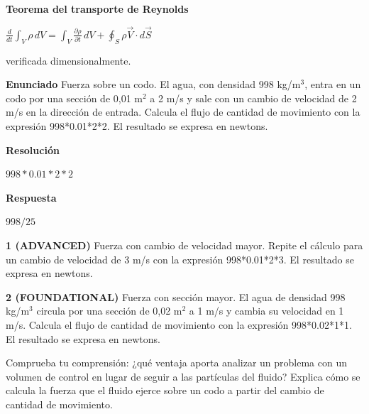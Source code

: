 \documentclass{book}
\begin{document}
\begin{tcolorbox}[title={Derivaciones}, studiumdef, breakable]

\noindent\textbf{Teorema del transporte de Reynolds}

\(\frac{d}{dt}\int_{V} \rho\,dV = \int_{V} \frac{\partial \rho}{\partial t}\,dV + \oint_{S} \rho \vec{V}\cdot d\vec{S}\)

\noindent\footnotesize verificada dimensionalmente.
\end{tcolorbox}

\begin{tcolorbox}[title={Problema resuelto}, studiumworked, breakable]

\noindent\textbf{Enunciado}
Fuerza sobre un codo. El agua, con densidad 998 kg/m\(^{3}\), entra en un codo por una sección de 0,01 m\(^{2}\) a 2 m/s y sale con un cambio de velocidad de 2 m/s en la dirección de entrada. Calcula el flujo de cantidad de movimiento con la expresión 998*0.01*2*2. El resultado se expresa en newtons.

\noindent\textbf{Resolución}

\(998*0.01*2*2\)

\noindent\textbf{Respuesta}

\(998/25\)
\end{tcolorbox}

\begin{tcolorbox}[title={Ejercicios}, studiumworked, breakable]

\noindent\textbf{1 (ADVANCED)}
Fuerza con cambio de velocidad mayor. Repite el cálculo para un cambio de velocidad de 3 m/s con la expresión 998*0.01*2*3. El resultado se expresa en newtons.

\noindent\textbf{2 (FOUNDATIONAL)}
Fuerza con sección mayor. El agua de densidad 998 kg/m\(^{3}\) circula por una sección de 0,02 m\(^{2}\) a 1 m/s y cambia su velocidad en 1 m/s. Calcula el flujo de cantidad de movimiento con la expresión 998*0.02*1*1. El resultado se expresa en newtons.
\end{tcolorbox}

\begin{tcolorbox}[title={Autoficha}, studiumcheck, breakable]

Comprueba tu comprensión: ¿qué ventaja aporta analizar un problema con un volumen de control en lugar de seguir a las partículas del fluido? Explica cómo se calcula la fuerza que el fluido ejerce sobre un codo a partir del cambio de cantidad de movimiento.
\end{tcolorbox}
\end{document}
